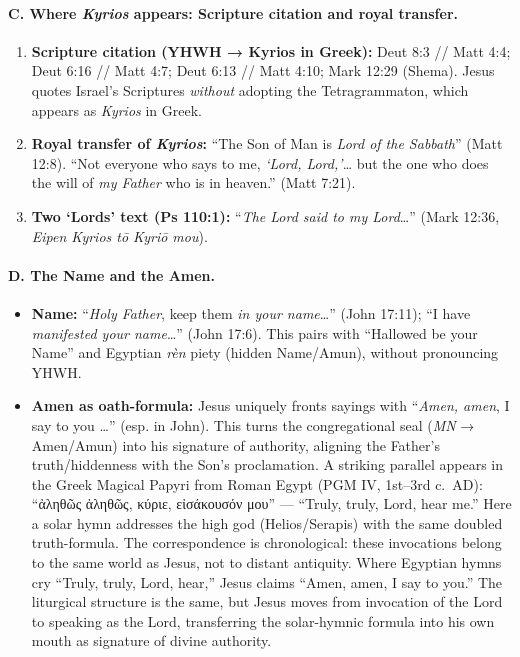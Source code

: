 \paragraph{C. Where \emph{Kyrios} appears: Scripture citation and royal transfer.}
\begin{enumerate}
    \item \textbf{Scripture citation (YHWH → Kyrios in Greek):} Deut 8:3 // Matt 4:4; Deut 6:16 // Matt 4:7; Deut 6:13 // Matt 4:10; Mark 12:29 (Shema). Jesus quotes Israel’s Scriptures \emph{without} adopting the Tetragrammaton, which appears as \emph{Kyrios} in Greek.
    \item \textbf{Royal transfer of \emph{Kyrios}:} “The Son of Man is \emph{Lord of the Sabbath}” (Matt 12:8). “Not everyone who says to me, \emph{‘Lord, Lord,’}… but the one who does the will of \emph{my Father} who is in heaven.” (Matt 7:21).
    \item \textbf{Two ‘Lords’ text (Ps 110:1):} “\emph{The Lord said to my Lord}…” (Mark 12:36, \emph{Eipen Kyrios tō Kyriō mou}).
\end{enumerate}

\paragraph{D. The Name and the Amen.}
\begin{itemize}
    \item \textbf{Name:} “\emph{Holy Father}, keep them \emph{in your name}…” (John 17:11); “I have \emph{manifested your name}…” (John 17:6). This pairs with “Hallowed be your Name” and Egyptian \emph{r\`en} piety (hidden Name/Amun), without pronouncing YHWH.
    \item \textbf{Amen as oath-formula:} Jesus uniquely fronts sayings with “\emph{Amen, amen}, I say to you …” (esp. in John). This turns the congregational seal (\emph{MN} → Amen/Amun) into his signature of authority, aligning the Father’s truth/hiddenness with the Son’s proclamation. A striking parallel appears in the Greek Magical Papyri from Roman Egypt (PGM IV, 1st--3rd c.~AD): “ἀληθῶς ἀληθῶς, κύριε, εἰσάκουσόν μου” --- “Truly, truly, Lord, hear me.” Here a solar hymn addresses the high god (Helios/Serapis) with the same doubled truth-formula. The correspondence is chronological: these invocations belong to the same world as Jesus, not to distant antiquity. Where Egyptian hymns cry “Truly, truly, Lord, hear,” Jesus claims “Amen, amen, I say to you.” The liturgical structure is the same, but Jesus moves from invocation of the Lord to speaking as the Lord, transferring the solar-hymnic formula into his own mouth as signature of divine authority.
\end{itemize}

